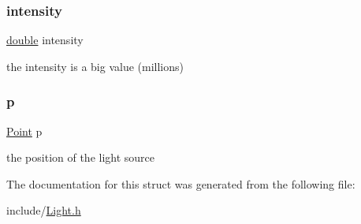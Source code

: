 \subsubsection{\texorpdfstring{intensity}{intensity}}
{\footnotesize\ttfamily \hyperlink{g3x__transfo_8h_a89b2b23e407882a535d835574a7912e1}{double} intensity}

the intensity is a big value (millions) \mbox{\label{struct_source_ae273773add45375b65c8555736acb60f}} 
\subsubsection{\texorpdfstring{p}{p}}
{\footnotesize\ttfamily \hyperlink{struct_point}{Point} p}

the position of the light source 

The documentation for this struct was generated from the following file\+:\begin{DoxyCompactItemize}
\item 
include/\hyperlink{_light_8h}{Light.\+h}\end{DoxyCompactItemize}
